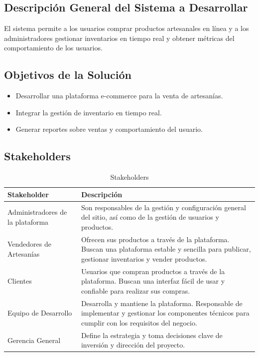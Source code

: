 \documentclass[12pt]{article}
\begin{document}
\subsection{Descripción General del Sistema a Desarrollar}
El sistema permite a los usuarios comprar productos artesanales en línea y a los administradores gestionar inventarios en tiempo real y obtener métricas del comportamiento de los usuarios.

\subsection{Objetivos de la Solución}
\begin{itemize}
    \item Desarrollar una plataforma e-commerce para la venta de artesanías.
    \item Integrar la gestión de inventario en tiempo real.
    \item Generar reportes sobre ventas y comportamiento del usuario.
\end{itemize}
\subsection{Stakeholders}

\begin{table}[H]
    \centering
    \begin{tabular}{|p{8cm}|p{8cm}|}
        \hline
        \textbf{Stakeholder} & \textbf{Descripción} \\ \hline
        Administradores de la plataforma & Son responsables de la gestión y configuración general del sitio, así como de la gestión de usuarios y productos. \\ \hline
        Vendedores de Artesanías & Ofrecen sus productos a través de la plataforma. Buscan una plataforma estable y sencilla para publicar, gestionar inventarios y vender productos. \\ \hline
        Clientes & Usuarios que compran productos a través de la plataforma. Buscan una interfaz fácil de usar y confiable para realizar sus compras. \\ \hline
        Equipo de Desarrollo & Desarrolla y mantiene la plataforma. Responsable de implementar y gestionar los componentes técnicos para cumplir con los requisitos del negocio. \\ \hline
        Gerencia General & Define la estrategia y toma decisiones clave de inversión y dirección del proyecto. \\ \hline
    \end{tabular}
    \caption{Stakeholders}
    \label{tab:stakeholders}
\end{table}
\end{document}
